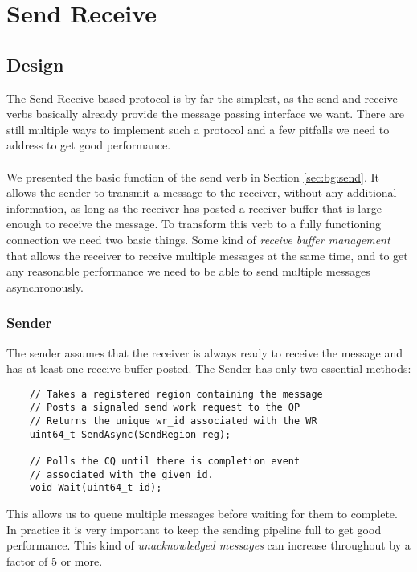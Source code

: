 \section{Send Receive} \label{sec:conn:send}\label{sendrcv}
\subsection{Design} \label{sendrcv-design}
The Send Receive based protocol is by far the simplest, as the send and receive verbs basically already provide the 
message passing interface we want. There are still multiple ways to implement such a protocol and a few pitfalls 
we need to address to get good performance.

\paragraph{} We presented the basic function of the send verb in Section \ref{sec:bg:send}. It allows the sender to transmit 
a message to the receiver, without any additional information, as long as the receiver has posted a receiver buffer that is 
large enough to receive the message. To transform this verb to a fully functioning connection we need two basic things. 
Some kind of \emph{receive buffer management} that allows the receiver to receive multiple messages at the same time, 
and to get any reasonable performance we need to be able to send multiple messages asynchronously.

\subsubsection{Sender} 
The sender assumes that the receiver is always ready to receive the message and has at least one receive buffer posted.
The Sender has only two essential methods:

\begin{lstlisting}  
    // Takes a registered region containing the message
    // Posts a signaled send work request to the QP
    // Returns the unique wr_id associated with the WR 
    uint64_t SendAsync(SendRegion reg);

    // Polls the CQ until there is completion event 
    // associated with the given id.
    void Wait(uint64_t id);

\end{lstlisting}

This allows us to queue multiple messages before waiting for them to complete. In practice it is very important to keep the
sending pipeline full to get good performance. This kind of \emph{unacknowledged messages} can increase throughout by a factor
of 5 or more.


